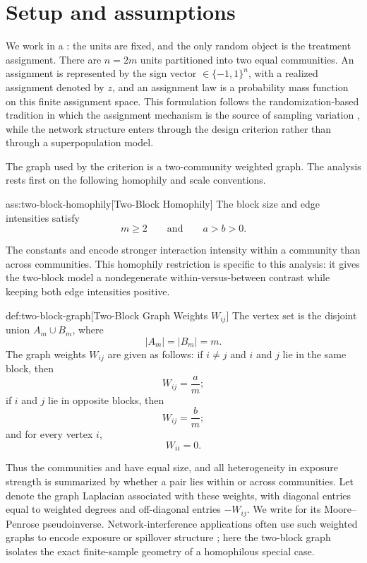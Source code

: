 \section{Setup and assumptions}

We work in a : the units are fixed, and the only random object is the treatment assignment. There are \(n=2m\) units partitioned into two equal communities. An assignment is represented by the sign vector \(\in\{-1,1\}^n\), with a realized assignment denoted by \(z\), and an assignment law  is a probability mass function on this finite assignment space. This formulation follows the randomization-based tradition in which the assignment mechanism is the source of sampling variation \citep{horvitz1952,rubin1974}, while the network structure enters through the design criterion rather than through a superpopulation model.

The graph used by the criterion is a two-community weighted graph. The analysis rests first on the following homophily and scale conventions.

\begin{assumptionv}{ass:two-block-homophily}[Two-Block Homophily]
The block size and edge intensities satisfy
\[
m\ge 2
\qquad\text{and}\qquad
a>b>0.
\]
\end{assumptionv}

The constants  and  encode stronger interaction intensity within a community than across communities. This homophily restriction is specific to this analysis: it gives the two-block model a nondegenerate within-versus-between contrast while keeping both edge intensities positive.

\begin{definitionv}{def:two-block-graph}[Two-Block Graph Weights \(W_{ij}\)]
The vertex set is the disjoint union \(A_m\cup B_m\), where
\[
|A_m|=|B_m|=m.
\]
The graph weights \(W_{ij}\) are given as follows: if \(i\ne j\) and \(i\) and \(j\) lie in the same block, then
\[
W_{ij}=\frac{a}{m};
\]
if \(i\) and \(j\) lie in opposite blocks, then
\[
W_{ij}=\frac{b}{m};
\]
and for every vertex \(i\),
\[
W_{ii}=0.
\]
\end{definitionv}

Thus the communities  and  have equal size, and all heterogeneity in exposure strength is summarized by whether a pair lies within or across communities. Let  denote the graph Laplacian associated with these weights, with diagonal entries equal to weighted degrees and off-diagonal entries \(-W_{ij}\). We write  for its Moore--Penrose pseudoinverse. Network-interference applications often use such weighted graphs to encode exposure or spillover structure \citep{hudgens2008,aronow2013,savje2017,leung2019,li2020}; here the two-block graph isolates the exact finite-sample geometry of a homophilous special case.

